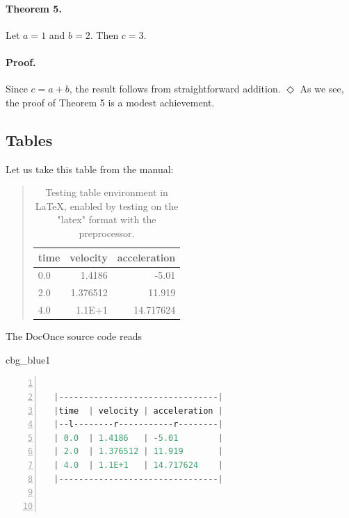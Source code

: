 \documentclass[%
oneside,                 %
final,                   %
10pt]{article}
\newenvironment{_cod_tight}[1]{
   \def\FrameCommand{\colorbox{#1}}
   \FrameRule0.6pt\MakeFramed {\FrameRestore}\vskip3mm}
   {\vskip0mm\endMakeFramed}
\newenvironment{cod}[1]{
\bgroup\rmfamily
\fboxsep=0mm\relax
\begin{_cod_tight}{#1}
\list{}{\parsep=-2mm\parskip=0mm\topsep=0pt\leftmargin=2mm
\rightmargin=2\leftmargin\leftmargin=4pt\relax}
\item\relax}
{\endlist\end{_cod_tight}\egroup}
\theoremstyle{definition}
\begin{document}
\begin{enumerate}
\paragraph{Theorem 5.}
Let $a=1$ and $b=2$. Then $c=3$.
\paragraph{Proof.}
Since $c=a+b$, the result follows from straightforward addition.
$\Diamond$
As we see, the proof of Theorem 5 is a modest
achievement.
\subsection{Tables}
\label{subsec:table}
Let us take this table from the manual:
\begin{table}
\caption{
Testing table environment in {\LaTeX}, enabled by testing on the "latex" format
with the preprocessor.
\label{mytab}
}
\begin{quote}
\begin{tabular}{lrr}
\hline
\multicolumn{1}{c}{ time } & \multicolumn{1}{c}{ velocity } & \multicolumn{1}{c}{ acceleration } \\
\hline
0.0  & 1.4186   & -5.01        \\
2.0  & 1.376512 & 11.919       \\
4.0  & 1.1E+1   & 14.717624    \\
\hline
\end{tabular}
\end{quote}
\noindent
\end{table}
The DocOnce source code reads
\begin{cod}{cbg_blue1}\begin{lstlisting}[language=Python,style=myspeciallststyle,numbers=left,numberstyle=\tiny,stepnumber=3,numbersep=15pt,xleftmargin=1mm]

  |--------------------------------|
  |time  | velocity | acceleration |
  |--l--------r-----------r--------|
  | 0.0  | 1.4186   | -5.01        |
  | 2.0  | 1.376512 | 11.919       |
  | 4.0  | 1.1E+1   | 14.717624    |
  |--------------------------------|



\end{lstlisting}
\end{cod}
\end{enumerate}
\end{document}
